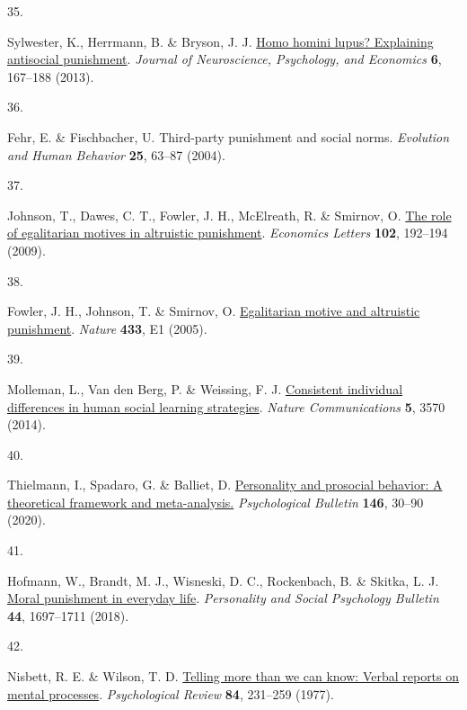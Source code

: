 \documentclass[
  man,floatsintext]{apa6}
\newlength{\cslhangindent}
\newlength{\csllabelwidth}
\newlength{\cslentryspacingunit} %
\newenvironment{CSLReferences}[2] %
 {%
  \setlength{\parindent}{0pt}
  \ifodd #1
  \let\oldpar\par
  \def\par{\hangindent=\cslhangindent\oldpar}
  \fi
  \setlength{\parskip}{#2\cslentryspacingunit}
 }%
 {}
\newcommand{\CSLLeftMargin}[1]{\parbox[t]{\csllabelwidth}{#1}}
\newcommand{\CSLRightInline}[1]{\parbox[t]{\linewidth - \csllabelwidth}{#1}\break}
\begin{document}
\begin{CSLReferences}{0}{0}
\leavevmode{}%
\CSLLeftMargin{35. }%
\CSLRightInline{Sylwester, K., Herrmann, B. \& Bryson, J. J. \href{https://doi.org/10.1037/npe0000009}{Homo homini lupus? Explaining antisocial punishment}. \emph{Journal of Neuroscience, Psychology, and Economics} \textbf{6}, 167--188 (2013).}

\leavevmode{}%
\CSLLeftMargin{36. }%
\CSLRightInline{Fehr, E. \& Fischbacher, U. Third-party punishment and social norms. \emph{Evolution and Human Behavior} \textbf{25}, 63--87 (2004).}

\leavevmode{}%
\CSLLeftMargin{37. }%
\CSLRightInline{Johnson, T., Dawes, C. T., Fowler, J. H., McElreath, R. \& Smirnov, O. \href{https://doi.org/10.1016/j.econlet.2009.01.003}{The role of egalitarian motives in altruistic punishment}. \emph{Economics Letters} \textbf{102}, 192--194 (2009).}

\leavevmode{}%
\CSLLeftMargin{38. }%
\CSLRightInline{Fowler, J. H., Johnson, T. \& Smirnov, O. \href{https://doi.org/10.1038/nature03256}{Egalitarian motive and altruistic punishment}. \emph{Nature} \textbf{433}, E1 (2005).}

\leavevmode{}%
\CSLLeftMargin{39. }%
\CSLRightInline{Molleman, L., Van den Berg, P. \& Weissing, F. J. \href{https://doi.org/10.1038/ncomms4570}{Consistent individual differences in human social learning strategies}. \emph{Nature Communications} \textbf{5}, 3570 (2014).}

\leavevmode{}%
\CSLLeftMargin{40. }%
\CSLRightInline{Thielmann, I., Spadaro, G. \& Balliet, D. \href{https://doi.org/10.1037/bul0000217}{Personality and prosocial behavior: A theoretical framework and meta-analysis.} \emph{Psychological Bulletin} \textbf{146}, 30--90 (2020).}

\leavevmode{}%
\CSLLeftMargin{41. }%
\CSLRightInline{Hofmann, W., Brandt, M. J., Wisneski, D. C., Rockenbach, B. \& Skitka, L. J. \href{https://doi.org/10.1177/0146167218775075}{Moral punishment in everyday life}. \emph{Personality and Social Psychology Bulletin} \textbf{44}, 1697--1711 (2018).}

\leavevmode{}%
\CSLLeftMargin{42. }%
\CSLRightInline{Nisbett, R. E. \& Wilson, T. D. \href{https://doi.org/10.1037/0033-295X.84.3.231}{Telling more than we can know: Verbal reports on mental processes}. \emph{Psychological Review} \textbf{84}, 231--259 (1977).}


\end{CSLReferences}
\end{document}
